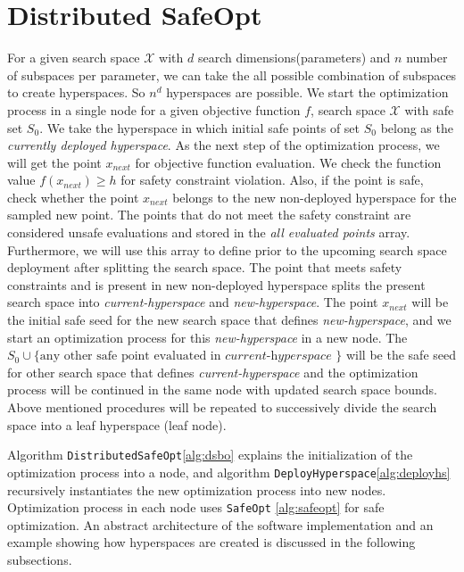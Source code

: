 \section{Distributed SafeOpt}
\label{sec:dsbo}
For a given search space $\mathcal{X}$ with $d$ search dimensions(parameters) and $n$ number of subspaces per parameter, we can take the all possible combination of subspaces to create hyperspaces. So $n^d$ hyperspaces are possible. 
We start the optimization process in a single node for a given objective function $f$, search space $\mathcal{X}$ with safe set $S_0$. 
We take the hyperspace in which initial safe points of set $S_0$ belong as the \textit{currently deployed hyperspace}. 
As the next step of the optimization process, we will get the point $x_{next}$ for objective function evaluation.
We check the function value $f(x_{next}) \geq h$ for safety constraint violation. 
Also, if the point is safe, check whether the point $x_{next}$ belongs to the new non-deployed hyperspace for the sampled new point. 
The points that do not meet the safety constraint are considered unsafe evaluations and stored in the \textit{all evaluated points} array. Furthermore, we will use this array to define prior to the upcoming search space deployment after splitting the search space.
The point that meets safety constraints and is present in new non-deployed hyperspace splits the present search space into \textit{current-hyperspace} and \textit{new-hyperspace}. 
The point $x_{next}$ will be the initial safe seed for the new search space that defines \textit{new-hyperspace}, and we start an optimization process for this \textit{new-hyperspace} in a new node. 
The $S_0 \cup \{ \text{any other safe point evaluated in }\textit{current-hyperspace } \}$ will be the safe seed for other search space that defines \textit{current-hyperspace} and the optimization process will be continued in the same node with updated search space bounds. 
Above mentioned procedures will be repeated to successively divide the search space into a leaf hyperspace (leaf node). 

Algorithm \texttt{DistributedSafeOpt}\ref{alg:dsbo} explains the initialization of the optimization process into a node, and algorithm \texttt{DeployHyperspace}\ref{alg:deployhs} recursively instantiates the new optimization process into new nodes. Optimization process in each node uses \texttt{SafeOpt} \ref{alg:safeopt} for safe optimization. An abstract architecture of the software implementation and an example showing how hyperspaces are created is discussed in the following subsections.

